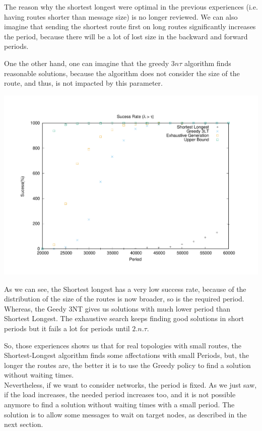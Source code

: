 \documentclass[a4paper,10pt]{article}
\begin{document}
      The reason why the shortest longest were optimal in the previous experiences (i.e. having routes shorter than message size) is no longer reviewed. We can also imagine that sending the shortest route first on long routes significantly increases the period, because there will be a lot of lost size in the backward and forward periods.
      
      One the other hand, one can imagine that the greedy $3n\tau$ algorithm finds reasonable solutions, because the algorithm does not consider the size of the route, and thus, is not impacted by this parameter.
       \begin{center}
      \includegraphics[scale=0.4]{echec_longues.pdf}
      \end{center}
     
      
      As we can see, the Shortest longest has a very low success rate, because of the distribution of the size of the routes is now broader, so is the required period.
      Whereas, the Geedy 3NT gives us solutions with much lower period than Shortest Longest. The exhaustive search keeps finding good solutions in short periods but it fails a lot for periods until $2.n.\tau$.

          
      So, those experiences shows us that for real topologies with small routes, the Shortest-Longest algorithm finds some affectations with small Periods, but, the longer the routes are, the better it is to use the Greedy policy to find a solution without waiting times.\\
      Nevertheless, if we want to consider networks, the period is fixed. As we just saw, if the load increases, the needed period increases too, and it is not possible anymore to find a solution without waiting times with a small period. The solution is to allow some messages to wait on target nodes, as described in the next section.
      
\end{document}

